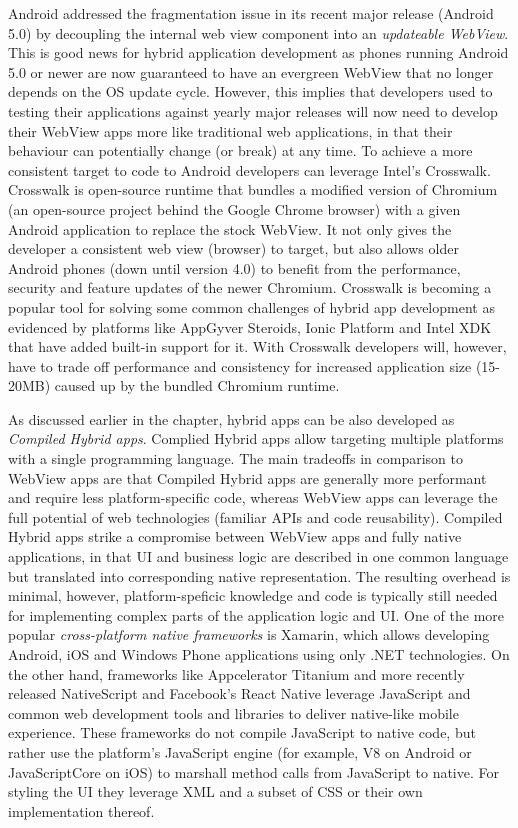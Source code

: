 \documentclass[thesis.tex]{subfiles}
\begin{document}
Android addressed the fragmentation issue in its recent major release (Android 5.0) by decoupling the internal web view component into an \textit{updateable WebView}. This is good news for hybrid application development as phones running Android 5.0 or newer are now guaranteed to have an evergreen WebView that no longer depends on the OS update cycle. However, this implies that developers used to testing their applications against yearly major releases will now need to develop their WebView apps more like traditional web applications, in that their behaviour can potentially change (or break) at any time. To achieve a more consistent target to code to Android developers can leverage Intel's Crosswalk. Crosswalk is open-source runtime that bundles a modified version of Chromium (an open-source project behind the Google Chrome browser) with a given Android application to replace the stock WebView. It not only gives the developer a consistent web view (browser) to target, but also allows older Android phones (down until version 4.0) to benefit from the performance, security and feature updates of the newer Chromium. Crosswalk is becoming a popular tool for solving some common challenges of hybrid app development as evidenced by platforms like AppGyver Steroids, Ionic Platform and Intel XDK that have added built-in support for it. With Crosswalk developers will, however, have to trade off performance and consistency for increased application size (15-20MB) caused up by the bundled Chromium runtime.

As discussed earlier in the chapter, hybrid apps can be also developed as \textit{Compiled Hybrid apps}. Complied Hybrid apps allow targeting multiple platforms with a single programming language. The main tradeoffs in comparison to WebView apps are that Compiled Hybrid apps are generally more performant and require less platform-specific code, whereas WebView apps can leverage the full potential of web technologies (familiar APIs and code reusability). Compiled Hybrid apps strike a compromise between WebView apps and fully native applications, in that UI and business logic are described in one common language but translated into corresponding native representation. The resulting overhead is minimal, however, platform-speficic knowledge and code is typically still needed for implementing complex parts of the application logic and UI. One of the more popular \textit{cross-platform native frameworks} is Xamarin, which allows developing Android, iOS and Windows Phone applications using only .NET technologies. On the other hand, frameworks like Appcelerator Titanium and more recently released NativeScript and Facebook's React Native leverage JavaScript and common web development tools and libraries to deliver native-like mobile experience. These frameworks do not compile JavaScript to native code, but rather use the platform's JavaScript engine (for example, V8 on Android or JavaScriptCore on iOS) to marshall method calls from JavaScript to native. For styling the UI they leverage XML and a subset of CSS or their own implementation thereof.
\end{document}

